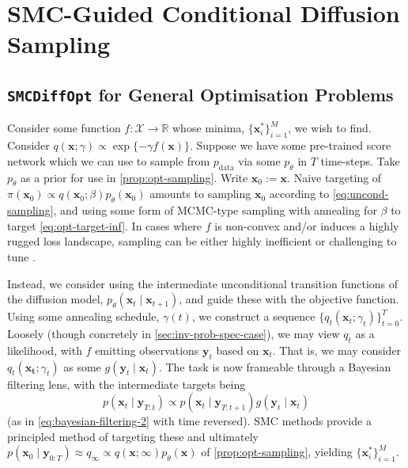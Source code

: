 \chapter{SMC-Guided Conditional Diffusion Sampling} \label{chap:methods}

\section{\texttt{SMCDiffOpt} for General Optimisation Problems} \label{sec:gen-opt}

Consider some function $f: \mathcal{X} \to \mathbb{R}$ whose minima, $\{\mathbf{x}^*_i\}_{i=1}^M$,
we wish to find. Consider $q(\mathbf{x}; \gamma) \propto \exp\{-\gamma f(\mathbf{x})\}$. Suppose we
have some pre-trained score network which we can use to sample from $p_{\text{data}}$ via some
$p_\theta$ in $T$ time-steps. Take $p_\theta$ as a prior for use in  \autoref{prop:opt-sampling}. Write
$\mathbf{x}_0 := \mathbf{x}$. Naive targeting of
$\pi(\mathbf{x}_0) \propto q(\mathbf{x}_0; \beta)p_\theta(\mathbf{x}_0)$ amounts to sampling
$\mathbf{x}_0$ according to \autoref{eq:uncond-sampling}, and using some form of MCMC-type sampling with
annealing for $\beta$ to target \autoref{eq:opt-target-inf}. In cases where $f$ is non-convex and/or
induces a highly rugged loss landscape, sampling can be either highly inefficient or challenging
to tune \parencite{kongDiffusionModelsConstrained2024}.

Instead, we consider using the intermediate unconditional transition functions of the diffusion
model, $p_\theta(\mathbf{x}_{t} \mid \mathbf{x}_{t+1})$, and guide these with the objective
function. Using some annealing schedule, $\gamma(t)$, we construct a sequence
$\{q_t(\mathbf{x}_t; \gamma_t)\}_{t=0}^T$. Loosely (though concretely in
\autoref{sec:inv-prob-spec-case}), we may view $q_t$ as a likelihood, with $f$ emitting observations
$\mathbf{y}_t$ based on $\mathbf{x}_t$. That is, we may consider $q_t(\mathbf{x_t}; \gamma_t)$
as some $g(\mathbf{y}_t \mid \mathbf{x}_t)$. The task is now frameable through a Bayesian filtering
lens, with the intermediate targets being
\begin{equation}
    p(\mathbf{x}_t \mid \mathbf{y}_{T:t}) \propto p(\mathbf{x}_t \mid \mathbf{y}_{T:t+1})g(\mathbf{y}_t \mid \mathbf{x}_t)
\end{equation}
(as in \autoref{eq:bayesian-filtering-2} with time reversed). SMC methods provide a principled
method of targeting these and ultimately
$p(\mathbf{x}_0 \mid \mathbf{y}_{0:T}) \approx q_\infty \propto q(\mathbf{x}; \infty)p_\theta(\mathbf{x})$
of \autoref{prop:opt-sampling}, yielding $\{\mathbf{x}^*_i\}_{i=1}^M$.

